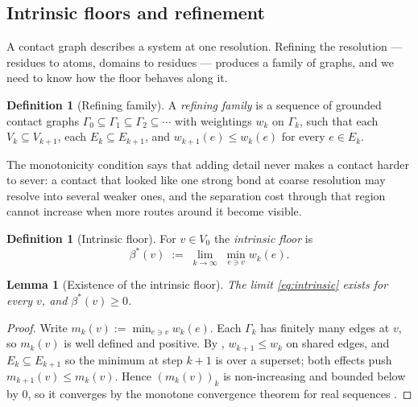 \documentclass[11pt,twocolumn,a4paper]{article}
\theoremstyle{thmstyle}
\newtheorem{lemma}[theorem]{Lemma}
\theoremstyle{definition}
\newtheorem{definition}[theorem]{Definition}
\theoremstyle{remark}
\newcommand{\Gph}{\Gamma}
\newcommand{\V}{V}
\newcommand{\E}{E}
\newcommand{\wt}{w}
\newcommand{\flo}{\beta}
\begin{document}
\subsection{Intrinsic floors and refinement}

A contact graph describes a system at one resolution. Refining the
resolution --- residues to atoms, domains to residues --- produces a
family of graphs, and we need to know how the floor behaves along it.

\begin{definition}[Refining family]
\label{def:refining}
A \emph{refining family} is a sequence of grounded contact graphs
$\Gph_0 \subseteq \Gph_1 \subseteq \Gph_2 \subseteq \cdots$ with
weightings $\wt_k$ on $\Gph_k$, such that each $\V_k \subseteq
\V_{k+1}$, each $\E_k \subseteq \E_{k+1}$, and
$\wt_{k+1}(e) \leq \wt_k(e)$ for every $e \in \E_k$.
\end{definition}

The monotonicity condition says that adding detail never makes a
contact harder to sever: a contact that looked like one strong bond at
coarse resolution may resolve into several weaker ones, and the
separation cost through that region cannot increase when more routes
around it become visible.

\begin{definition}[Intrinsic floor]
\label{def:intrinsic}
For $v \in \V_0$ the \emph{intrinsic floor} is
\begin{equation}
  \flo^{*}(v) \;:=\; \lim_{k \to \infty}\; \min_{e \ni v} \wt_k(e).
  \label{eq:intrinsic}
\end{equation}
\end{definition}

\begin{lemma}[Existence of the intrinsic floor]
\label{lem:intrinsic}
The limit \eqref{eq:intrinsic} exists for every $v$, and
$\flo^{*}(v) \geq 0$.
\end{lemma}

\begin{proof}
Write $m_k(v) := \min_{e \ni v} \wt_k(e)$. Each $\Gph_k$ has finitely
many edges at $v$, so $m_k(v)$ is well defined and positive. By
, $\wt_{k+1} \leq \wt_k$ on shared edges, and
$\E_k \subseteq \E_{k+1}$ so the minimum at step $k+1$ is over a
superset; both effects push $m_{k+1}(v) \leq m_k(v)$. Hence
$(m_k(v))_k$ is non-increasing and bounded below by $0$, so it
converges by the monotone convergence theorem for real sequences
\citep{rudin1976}.
\end{proof}
\end{document}
